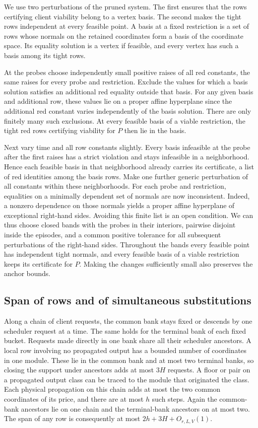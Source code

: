 We use two perturbations of the pruned system. The first ensures that the rows
certifying client viability belong to a vertex basis. The second makes the tight
rows independent at every feasible point. A basis at a fixed restriction is a set
of rows whose normals on the retained coordinates form a basis of the coordinate
space. Its equality solution is a vertex if feasible, and every vertex has such a
basis among its tight rows.

At the probes choose independently small positive raises of all red constants, the
same raises for every probe and restriction. Exclude the values for which a basis
solution satisfies an additional red equality outside that basis. For any given
basis and additional row, these values lie on a proper affine hyperplane since
the additional red constant varies independently of the basis solution. There are
only finitely many such exclusions. At every feasible basis of a viable restriction,
the tight red rows certifying viability for \(P\) then lie in the basis.

Next vary time and all row constants slightly. Every basis infeasible at the
probe after the first raises has a strict violation and stays infeasible in a
neighborhood. Hence each feasible basis in that neighborhood already carries
its certificate, a list of red identities among the basis rows. Make one further
generic perturbation of all constants within these neighborhoods. For each probe
and restriction, equalities on a minimally dependent set of normals are now
inconsistent. Indeed, a nonzero dependence on those normals yields a proper
affine hyperplane of exceptional right-hand sides. Avoiding this finite list is
an open condition. We can thus choose closed bands with the probes in their
interiors, pairwise disjoint inside the episodes, and a common positive tolerance
for all subsequent perturbations of the right-hand sides. Throughout the bands
every feasible point has independent tight normals, and every feasible basis
of a viable restriction keeps its certificate for \(P\). Making the changes
sufficiently small also preserves the anchor bounds.

\subsection{Span of rows and of simultaneous substitutions}

Along a chain of client requests, the common bank stays fixed or descends by one
scheduler request at a time. The same holds for the terminal bank of each fixed
bucket. Requests made directly in one bank share all their scheduler ancestors.
A local row involving no propagated output has a bounded number of coordinates
in one module. These lie in the common bank and at most two terminal banks, so
closing the support under ancestors adds at most \(3H\) requests. A floor or
pair on a propagated output class can be traced to the module that originated
the class. Each physical propagation on this chain adds at most the two common
coordinates of its price, and there are at most \(h\) such steps. Again the
common-bank ancestors lie on one chain and the terminal-bank ancestors on at
most two. The span of any row is consequently at most
\(2h+3H+O_{r,L,V}(1)\).

